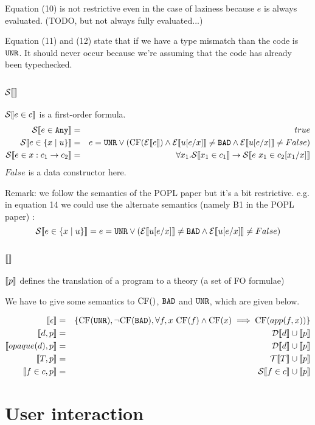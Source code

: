 \documentclass{article}
\begin{document}
Equation (10) is not restrictive even in the case of laziness because $e$ is always evaluated. (TODO, but not always fully evaluated...)

Equation (11) and (12) state that if we have a type mismatch than the code is $\texttt{UNR}$. It should never occur because we're assuming that the code has already been typechecked.


\subsection{$\mathcal{S} \llbracket  \rrbracket$}
$\mathcal{S} \llbracket e \in c \rrbracket$ is a first-order formula.
\begin{eqnarray}
\mathcal{S} \llbracket e \in \texttt{Any} \rrbracket &=& true\\
\mathcal{S} \llbracket e \in \{x \mid u \} \rrbracket &=& e = \texttt{UNR} \lor (\mbox{CF}(\mathcal{E} \llbracket e \rrbracket) \land \mathcal{E} \llbracket u[e/x] \rrbracket \neq \texttt{BAD} \land \mathcal{E} \llbracket u[e/x] \rrbracket \neq False)\\
\mathcal{S} \llbracket e \in x:c_1 \to c_2 \rrbracket  &=& \forall x_1. \mathcal{S} \llbracket x_1 \in c_1 \rrbracket \to \mathcal{S} \llbracket e~x_1 \in c_2[x_1/x] \rrbracket
\end{eqnarray}
$False$ is a data constructor here.

Remark: we follow the semantics of the POPL paper but it's a bit restrictive.
e.g. in equation 14 we could use the alternate semantics (namely B1 in the POPL paper) : 
$$\mathcal{S} \llbracket e \in \{x \mid u \} \rrbracket = e = \texttt{UNR} \lor (\mathcal{E} \llbracket u[e/x] \rrbracket \neq \texttt{BAD} \land \mathcal{E} \llbracket u[e/x] \rrbracket \neq False)$$

\subsection{$\llbracket  \rrbracket$}
$\llbracket p \rrbracket$ defines the translation of a program to a theory (a set of FO formulae)

We have to give some semantics to $\mbox{CF}()$, $\texttt{BAD}$ and $\texttt{UNR}$, which are given below.

\begin{eqnarray}
\llbracket \epsilon \rrbracket &=& \{ \mbox{CF}(\texttt{UNR}), \lnot \mbox{CF}(\texttt{BAD}), \forall f,x~\mbox{CF}(f) \land \mbox{CF}(x) \implies \mbox{CF}(app(f,x)) \}\\
\llbracket d,p \rrbracket &=& \mathcal{D} \llbracket d \rrbracket \cup \llbracket p \rrbracket\\
\llbracket opaque(d),p \rrbracket &=& \mathcal{D} \llbracket d \rrbracket \cup \llbracket p \rrbracket\\
\llbracket T,p \rrbracket &=& \mathcal{T} \llbracket T \rrbracket \cup \llbracket p \rrbracket\\
\llbracket f \in c,p \rrbracket &=& \mathcal{S} \llbracket f \in c \rrbracket \cup \llbracket p \rrbracket\\
\end{eqnarray}

\section{User interaction}
\end{document}
